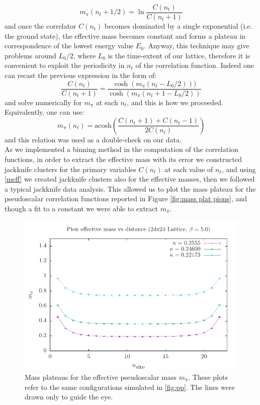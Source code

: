 \begin{equation}
    m_\pi(n_t + 1/2) = \ln \frac{C(n_t)}{C(n_t + 1)}
\end{equation}
and once the correlator $C(n_t)$ becomes dominated by a single exponential (i.e. the ground state), the effective mass becomes constant and forms a plateau in correspondence of the lowest energy value $E_0$. Anyway, this technique may give problems around $L_0/2$, where $L_0$ is the time-extent of our lattice, therefore it is convenient to exploit the periodicity in $n_t$ of the correlation function. Indeed one can recast the previous expression in the form of:
\begin{equation}\label{meff}
    \frac{C(n_t)}{C(n_t + 1)} = \frac{\cosh(m_\pi(n_t - L_0/2)))}{\cosh(m_\pi (n_t + 1 - L_0/2))}
\end{equation}
and solve numerically for $m_\pi$ at each $n_t$, and this is how we proceeded. Equivalently, one can use:
\begin{equation}\label{meff2}
    m_\pi(n_t) = \textrm{acosh}\left(\frac{C(n_t + 1) + C(n_t - 1)}{2C(n_t)}\right)
\end{equation}
and this relation was used as a double-check on our data.
\\ As we implemented a binning method in the computation of the correlation functions, in order to extract the effective mass with its error we constructed jackknife clusters for the primary variables $C(n_t)$ at each value of $n_t$, and using \eqref{meff} we created jackknife clusters also for the effective masses, then we followed a typical jackknife data analysis. This allowed us to plot the mass plateau for the pseudoscalar correlation functions reported in Figure \eqref{fig:mass plat pions}, and though a fit to a constant we were able to extract $m_\pi$. 
\begin{figure}
    \centering
    \includegraphics[width=0.7\linewidth]{images/pp_mass.pdf}
    \caption{Mass plateaus for the effective pseudoscalar mass $m_\pi$. These plots refer to the same configurations simulated in \eqref{fig:pp}. The lines were drawn only to guide the eye.}
    \label{fig:mass plat pions}
\end{figure}

